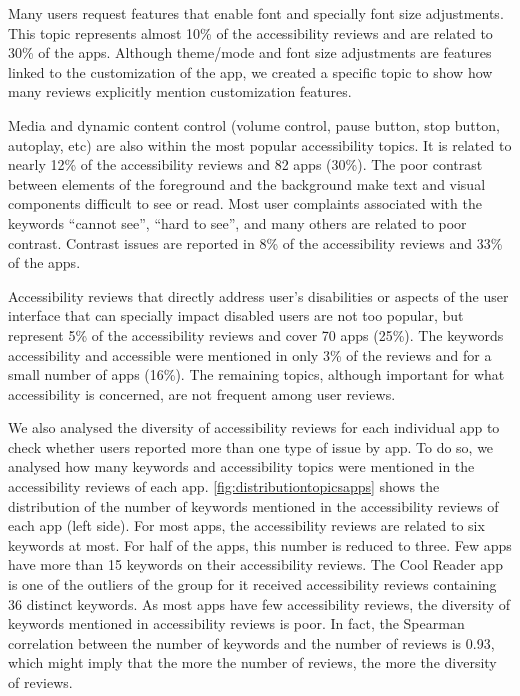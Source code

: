 Many users request features that enable font and specially font size adjustments. This topic represents almost 10\% of the accessibility reviews and are related to 30\% of the apps.
Although theme/mode and font size adjustments are features linked to the customization of the app, we created a specific topic to show how many reviews explicitly mention customization features. 

Media and dynamic content control (volume control, pause button, stop button, autoplay, etc) are also within the most popular accessibility topics. It is related to nearly 12\% of the accessibility reviews and 82 apps (30\%). 
The poor contrast between elements of the foreground and the background make text and visual components difficult to see or read. Most user complaints associated with the keywords ``cannot see'', ``hard to see'', and many others are related to poor contrast. Contrast issues are reported in 8\% of the accessibility reviews and 33\% of the apps.

Accessibility reviews that directly address user's disabilities or aspects of the user interface that can specially impact disabled users are not too popular, but represent 5\% of the accessibility reviews and cover 70 apps (25\%). The keywords accessibility and accessible were mentioned in only 3\% of the reviews and for a small number of apps (16\%).
The remaining topics, although important for what accessibility is concerned, are not frequent among user reviews.

We also analysed the diversity of accessibility reviews for each individual app to check whether users reported more than one type of issue by app.
To do so, we analysed how many keywords and accessibility topics were mentioned in the accessibility reviews of each app. 
\autoref{fig:distributiontopicsapps} shows the distribution of the number of keywords mentioned in the accessibility reviews of each app (left side). 
For most apps, the accessibility reviews are related to six keywords at most. For half of the apps, this number is reduced to three. Few apps have more than 15 keywords on their accessibility reviews. The Cool Reader app is one of the outliers of the group for it received accessibility reviews containing 36 distinct keywords. As most apps have few accessibility reviews, the diversity of keywords mentioned in accessibility reviews is poor. In fact, the Spearman correlation between the number of keywords and the number of reviews is 0.93, which might imply that the more the number of reviews, the more the diversity of reviews.


